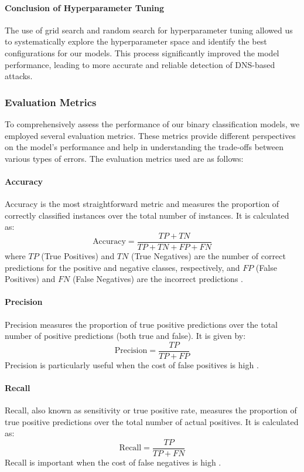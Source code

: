 \paragraph{Conclusion of Hyperparameter Tuning}

The use of grid search and random search for hyperparameter tuning allowed us to systematically explore the hyperparameter space and identify the best configurations for our models. This process significantly improved the model performance, leading to more accurate and reliable detection of DNS-based attacks.


\subsubsection{Evaluation Metrics}

To comprehensively assess the performance of our binary classification models, we employed several evaluation metrics. These metrics provide different perspectives on the model’s performance and help in understanding the trade-offs between various types of errors. The evaluation metrics used are as follows:

\paragraph{Accuracy}
Accuracy is the most straightforward metric and measures the proportion of correctly classified instances over the total number of instances. It is calculated as:
\[
\text{Accuracy} = \frac{TP + TN}{TP + TN + FP + FN}
\]
where \(TP\) (True Positives) and \(TN\) (True Negatives) are the number of correct predictions for the positive and negative classes, respectively, and \(FP\) (False Positives) and \(FN\) (False Negatives) are the incorrect predictions \cite{powers2011evaluation}.

\paragraph{Precision}
Precision measures the proportion of true positive predictions over the total number of positive predictions (both true and false). It is given by:
\[
\text{Precision} = \frac{TP}{TP + FP}
\]
Precision is particularly useful when the cost of false positives is high \cite{sokolova2006beyond}.

\paragraph{Recall}
Recall, also known as sensitivity or true positive rate, measures the proportion of true positive predictions over the total number of actual positives. It is calculated as:
\[
\text{Recall} = \frac{TP}{TP + FN}
\]
Recall is important when the cost of false negatives is high \cite{sokolova2006beyond}.

